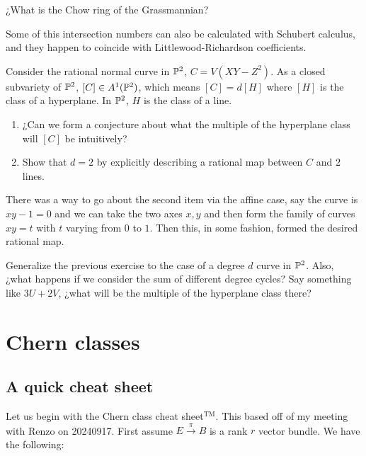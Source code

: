 \documentclass[12pt]{memoir}
\begin{document}
\begin{Qn}
    ¿What is the Chow ring of the Grassmannian?
\end{Qn}

\begin{Rmk}
    Some of this intersection numbers can also be calculated with Schubert calculus, and they happen to coincide with Littlewood-Richardson coefficients.    
\end{Rmk}

\begin{Ej}
    Consider the rational normal curve in $\mathbb{P}^2$, $C=V(XY-Z^2)$. As a closed subvariety of $\mathbb{P}^2$, $[C]\in A^1(\mathbb{P}^2)$, which means $[C]=d[H]$ where $[H]$ is the class of a hyperplane. In $\mathbb{P}^2$, $H$ is the class of a line.
    \begin{enumerate}
        \item ¿Can we form a conjecture about what the multiple of the hyperplane class will $[C]$ be intuitively?
        \item Show that $d=2$ by explicitly describing a rational map between $C$ and $2$ lines.
    \end{enumerate}
\end{Ej}

\begin{ptcb}
There was a way to go about the second item via the affine case, say the curve is $xy-1=0$ and we can take the two axes $x,y$ and then form the family of curves $xy=t$ with $t$ varying from $0$ to $1$. Then this, in some fashion, formed the desired rational map. 
\end{ptcb}

\begin{Ej}
    Generalize the previous exercise to the case of a degree $d$ curve in $\mathbb{P}^2$. Also, ¿what happens if we consider the sum of different degree cycles? Say something like $3U+2V$, ¿what will be the multiple of the hyperplane class there?
\end{Ej}

\section{Chern classes}

\subsection{A quick cheat sheet}

Let us begin with the Chern class cheat sheet${}^{\text{TM}}$. This based off of my meeting with Renzo on 20240917. First assume $E\xrightarrow{\pi}B$ is a rank $r$ vector bundle. We have the following:
\end{document}
